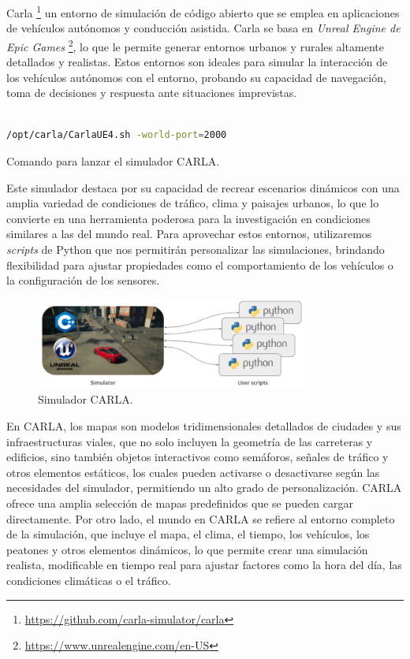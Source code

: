 Carla \footnote{\url{https://github.com/carla-simulator/carla}} un entorno de simulación de código abierto que se emplea en aplicaciones de vehículos autónomos y conducción asistida. Carla se basa en \textit{Unreal Engine de Epic Games} \footnote{\url{https://www.unrealengine.com/en-US}}, lo que le permite generar entornos urbanos y rurales altamente detallados y realistas. Estos entornos son ideales para simular la interacción de los vehículos autónomos con el entorno, probando su capacidad de navegación, toma de decisiones y respuesta ante situaciones imprevistas.

\begin{code}[h]
\begin{lstlisting}[language=bash]

/opt/carla/CarlaUE4.sh -world-port=2000

\end{lstlisting}
\caption[Comando para lanzar el simulador CARLA]{Comando para lanzar el simulador CARLA.}
\label{cod:cmdcarla}
\end{code}

Este simulador destaca por su capacidad de recrear escenarios dinámicos con una amplia variedad de condiciones de tráfico, clima y paisajes urbanos, lo que lo convierte en una herramienta poderosa para la investigación en condiciones similares a las del mundo real. Para aprovechar estos entornos, utilizaremos \textit{scripts} de Python que nos permitirán personalizar las simulaciones, brindando flexibilidad para ajustar propiedades como el comportamiento de los vehículos o la configuración de los sensores.

\begin{figure}[ht]
  \begin{center}
    \includegraphics[width=9cm]{figs/Plataformas_Desarollo/carla.png}
  \end{center}
  \caption{Simulador CARLA.}
  \label{carla}
\end{figure}

En CARLA, los mapas son modelos tridimensionales detallados de ciudades y sus infraestructuras viales, que no solo incluyen la geometría de las carreteras y edificios, sino también objetos interactivos como semáforos, señales de tráfico y otros elementos estáticos, los cuales pueden activarse o desactivarse según las necesidades del simulador, permitiendo un alto grado de personalización. CARLA ofrece una amplia selección de mapas predefinidos que se pueden cargar directamente. Por otro lado, el mundo en CARLA se refiere al entorno completo de la simulación, que incluye el mapa, el clima, el tiempo, los vehículos, los peatones y otros elementos dinámicos, lo que permite crear una simulación realista, modificable en tiempo real para ajustar factores como la hora del día, las condiciones climáticas o el tráfico.

